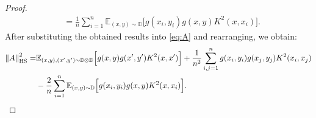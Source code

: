 \begin{proof}
{\begin{align*}
    &=\frac{1}{n}\sum_{i=1}^n\mathbb{E}_{(x,y)\sim\mathbb{D}}\Big[g(x_i, y_i)g(x, y)K^2(x,x_i)\Big].
\end{align*}
After substituting the obtained results into \cref{eq:A} and rearranging, we obtain:
\begin{align*}
    \left\|A\right\|_{\operatorname{HS}}^2=&\mathbb{E}_{(x,y),(x',y')\sim\mathbb{D}\otimes\mathbb{D}}\Big[g(x,y)g(x',y')K^2(x,x')\Big]+\frac{1}{n^2}\sum_{i,j=1}^n g(x_i, y_i)g(x_j, y_j)K^2(x_i,x_j)\\
    &-\frac{2}{n}\sum_{i=1}^n\mathbb{E}_{(x,y)\sim\mathbb{D}}\Big[g(x_i, y_i)g(x, y)K^2(x,x_i)\Big].
\end{align*}
}
\end{proof}